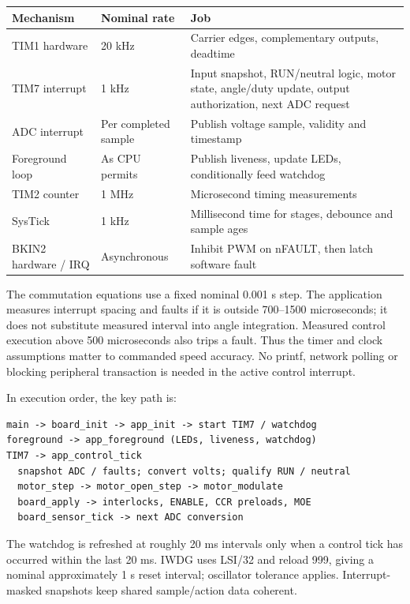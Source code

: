 \documentclass[11pt,letterpaper]{article}
\begin{document}
\begin{table}[H]
\centering\small
\begin{tabularx}{\linewidth}{@{}l l Y@{}}
\toprule
Mechanism & Nominal rate & Job \\
\midrule
TIM1 hardware & 20 kHz & Carrier edges, complementary outputs, deadtime \\
TIM7 interrupt & 1 kHz & Input snapshot, RUN/neutral logic, motor state,
angle/duty update, output authorization, next ADC request \\
ADC interrupt & Per completed sample & Publish voltage sample, validity and timestamp \\
Foreground loop & As CPU permits & Publish liveness, update LEDs, conditionally feed watchdog \\
TIM2 counter & 1 MHz & Microsecond timing measurements \\
SysTick & 1 kHz & Millisecond time for stages, debounce and sample ages \\
BKIN2 hardware / IRQ & Asynchronous & Inhibit PWM on nFAULT, then latch software fault \\
\bottomrule
\end{tabularx}
\end{table}

The commutation equations use a fixed nominal 0.001 s step. The application
measures interrupt spacing and faults if it is outside 700--1500 microseconds;
it does not substitute measured interval into angle integration. Measured
control execution above 500 microseconds also trips a fault. Thus the timer
and clock assumptions matter to commanded speed accuracy. No printf,
network polling or blocking peripheral transaction is needed in the active
control interrupt.

\begin{minipage}{\linewidth}
In execution order, the key path is:
\begin{lstlisting}
main -> board_init -> app_init -> start TIM7 / watchdog
foreground -> app_foreground (LEDs, liveness, watchdog)
TIM7 -> app_control_tick
  snapshot ADC / faults; convert volts; qualify RUN / neutral
  motor_step -> motor_open_step -> motor_modulate
  board_apply -> interlocks, ENABLE, CCR preloads, MOE
  board_sensor_tick -> next ADC conversion
\end{lstlisting}
\end{minipage}

The watchdog is refreshed at roughly 20 ms intervals only when a control tick
has occurred within the last 20 ms. IWDG uses LSI/32 and reload 999, giving a
nominal approximately 1 s reset interval; oscillator tolerance applies.
Interrupt-masked snapshots keep shared sample/action data coherent.
\end{document}
